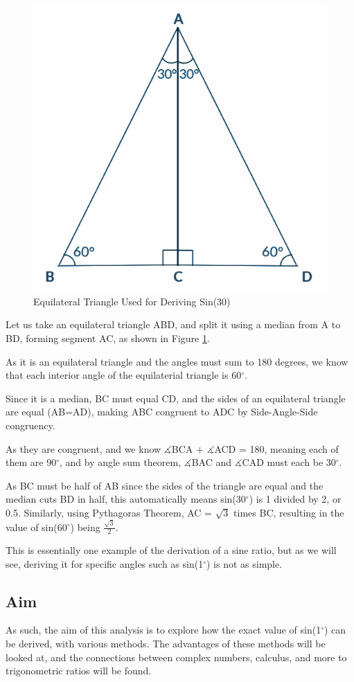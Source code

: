 \documentclass[12pt]{article}
\begin{document}
\begin{figure}[h]
    \centering
    \includegraphics[width=0.4\linewidth]{306090triangle.png}
    \caption{Equilateral Triangle Used for Deriving Sin(30)}
    \label{fig:30}
\end{figure}

Let us take an equilateral triangle ABD, and split it using a median from A to BD, forming segment AC, as shown in Figure \ref{fig:30}.


As it is an equilateral triangle and the angles must sum to 180 degrees, we know that each interior angle of the equilaterial triangle is 60$^{\circ}$.

Since it is a median, BC must equal CD, and the sides of an equilateral triangle are equal (AB=AD), making ABC congruent to ADC by Side-Angle-Side congruency.

As they are congruent, and we know $\measuredangle$BCA + $\measuredangle$ACD = 180, meaning each of them are 90$^{\circ}$, and by angle sum theorem, $\measuredangle$BAC and $\measuredangle$CAD must each be 30$^{\circ}$.

As BC must be half of AB since the sides of the triangle are equal and the median cuts BD in half, this automatically means sin(30$^{\circ}$) is 1 divided by 2, or 0.5. Similarly, using Pythagoras Theorem, AC = $\sqrt{3}$ times BC, resulting in the value of sin(60$^{\circ}$) being $\frac{\sqrt{3}}{2}$.

This is essentially one example of the derivation of a sine ratio, but as we will see, deriving it for specific angles such as sin(1$^{\circ}$) is not as simple.

\subsection{Aim}
As such, the aim of this analysis is to explore how the exact value of sin(1$^{\circ}$) can be derived, with various methods. The advantages of these methods will be looked at, and the connections between complex numbers, calculus, and more to trigonometric ratios will be found.
\end{document}
